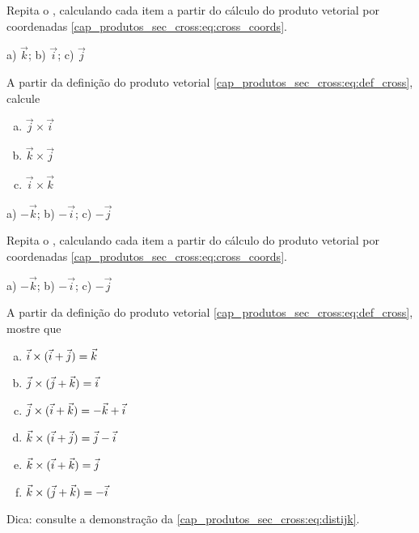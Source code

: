 \begin{exer}
  Repita o , calculando cada item a partir do cálculo do produto vetorial por coordenadas \eqref{cap_produtos_sec_cross:eq:cross_coords}.
\end{exer}
\begin{resp}
  a) $\vec{k}$; b) $\vec{i}$; c) $\vec{j}$
\end{resp}


\begin{exer}\label{cap_produtos_sec_cross:exer:jki}
  A partir da definição do produto vetorial \eqref{cap_produtos_sec_cross:eq:def_cross}, calcule
  \begin{enumerate}[a)]
    \item $\vec{j}\times\vec{i}$
    \item $\vec{k}\times\vec{j}$
    \item $\vec{i}\times\vec{k}$
  \end{enumerate}
\end{exer}
\begin{resp}
  a) $-\vec{k}$; b) $-\vec{i}$; c) $-\vec{j}$
\end{resp}

\begin{exer}
  Repita o , calculando cada item a partir do cálculo do produto vetorial por coordenadas \eqref{cap_produtos_sec_cross:eq:cross_coords}.
\end{exer}
\begin{resp}
  a) $-\vec{k}$; b) $-\vec{i}$; c) $-\vec{j}$
\end{resp}

\begin{exer}\label{cap_produtos_sec_cross:exer:distcanonicos}
  A partir da definição do produto vetorial \eqref{cap_produtos_sec_cross:eq:def_cross}, mostre que
  \begin{enumerate}[a)]
    \item $\vec{i}\times(\vec{i}+\vec{j}) = \vec{k}$
    \item $\vec{j}\times(\vec{j}+\vec{k}) = \vec{i}$
    \item $\vec{j}\times(\vec{i}+\vec{k}) = -\vec{k}+\vec{i}$
    \item $\vec{k}\times(\vec{i}+\vec{j}) = \vec{j}-\vec{i}$
    \item $\vec{k}\times(\vec{i}+\vec{k}) = \vec{j}$
    \item $\vec{k}\times(\vec{j}+\vec{k}) = -\vec{i}$
  \end{enumerate}
\end{exer}
\begin{resp}
  Dica: consulte a demonstração da \eqref{cap_produtos_sec_cross:eq:distijk}.
\end{resp}


